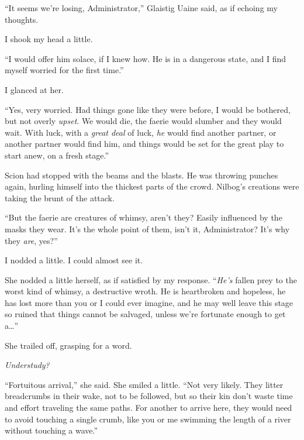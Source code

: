 ``It seems we're losing, Administrator,'' Glaistig Uaine said, as if echoing my thoughts.



I shook my head a little.



``I would offer him solace, if I knew how.  He is in a dangerous state, and I find myself worried for the first time.''



I glanced at her.



``Yes, very worried.  Had things gone like they were before, I would be bothered, but not overly \emph{upset}.  We would die, the faerie would slumber and they would wait.  With luck, with a \emph{great deal }of luck, \emph{he} would find another partner, or another partner would find him, and things would be set for the great play to start anew, on a fresh stage.''



Scion had stopped with the beams and the blasts.  He was throwing punches again, hurling himself into the thickest parts of the crowd.  Nilbog's creations were taking the brunt of the attack.



``But the faerie are creatures of whimsy, aren't they?  Easily influenced by the masks they wear.  It's the whole point of them, isn't it, Administrator?  It's why they \emph{are}, yes?''



I nodded a little.  I could almost see it.



She nodded a little herself, as if satisfied by my response.  ``\emph{He's} fallen prey to the worst kind of whimsy, a destructive wroth.  He is heartbroken and hopeless, he has lost more than you or I could ever imagine, and he may well leave this stage so ruined that things cannot be salvaged, unless we're fortunate enough to get a\ldots''



She trailed off, grasping for a word.



\emph{Understudy?}



``Fortuitous arrival,'' she said.  She smiled a little.  ``Not very likely.  They litter breadcrumbs in their wake, not to be followed, but so their kin don't waste time and effort traveling the same paths.  For another to arrive here, they would need to avoid touching a single crumb, like you or me swimming the length of a river without touching a wave.''



